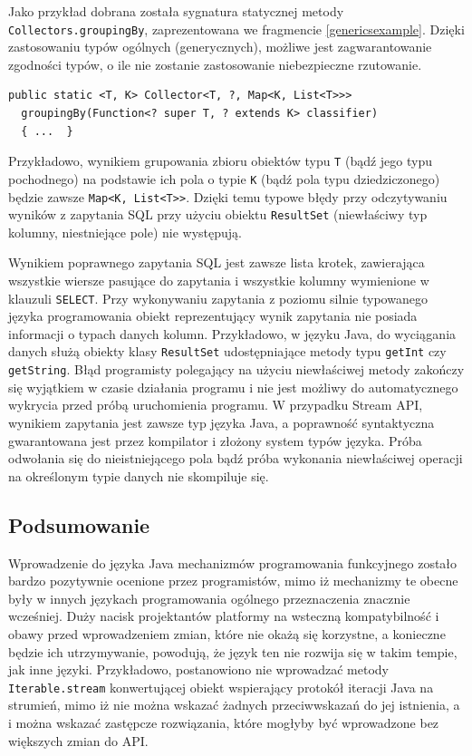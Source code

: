 \documentclass[12pt,twoside,openright]{extarticle}
\begin{document}
    Jako przykład dobrana została sygnatura statycznej metody \newline \texttt{Collectors.groupingBy}, zaprezentowana we fragmencie \ref{genericsexample}. Dzięki zastosowaniu typów ogólnych \cite{generics} (generycznych), możliwe jest zagwarantowanie zgodności typów, o ile nie zostanie zastosowanie niebezpieczne rzutowanie.

\begin{lstlisting}[label=genericsexample, caption=Sygnatura metody grupującej]
  public static <T, K> Collector<T, ?, Map<K, List<T>>>
  groupingBy(Function<? super T, ? extends K> classifier) 
  { ...  }
\end{lstlisting}

    Przykładowo, wynikiem grupowania zbioru obiektów typu \texttt{T} (bądź jego typu pochodnego) na podstawie ich pola o typie \texttt{K} (bądź pola typu dziedziczonego) będzie zawsze \texttt{Map<K, List<T>}\texttt{>}. Dzięki temu typowe błędy przy odczytywaniu wyników z zapytania SQL przy użyciu obiektu \texttt{ResultSet} (niewłaściwy typ kolumny, niestniejące pole) nie występują.

    Wynikiem poprawnego zapytania SQL jest zawsze lista krotek, zawierająca wszystkie wiersze pasujące do zapytania i wszystkie kolumny wymienione w klauzuli \texttt{SELECT}. Przy wykonywaniu zapytania z poziomu silnie typowanego języka programowania obiekt reprezentujący wynik zapytania nie posiada informacji o typach danych kolumn. Przykładowo, w języku Java, do wyciągania danych służą obiekty klasy \texttt{ResultSet} udostępniające metody typu \texttt{getInt} czy \texttt{getString}. Błąd programisty polegający na użyciu niewłaściwej metody zakończy się wyjątkiem w czasie działania programu i nie jest możliwy do automatycznego wykrycia przed próbą uruchomienia programu. W przypadku Stream API, wynikiem zapytania jest zawsze typ języka Java, a poprawność syntaktyczna gwarantowana jest przez kompilator i złożony system typów języka. Próba odwołania się do nieistniejącego pola bądź próba wykonania niewłaściwej operacji na określonym typie danych nie skompiluje się. 

\subsection{Podsumowanie}

    Wprowadzenie do języka Java mechanizmów programowania funkcyjnego zostało bardzo pozytywnie ocenione przez programistów, mimo iż mechanizmy te obecne były w innych językach programowania ogólnego przeznaczenia znacznie wcześniej. Duży nacisk projektantów platformy na wsteczną kompatybilność i obawy przed wprowadzeniem zmian, które nie okażą się korzystne, a konieczne będzie ich utrzymywanie, powodują, że język ten nie rozwija się w takim tempie, jak inne języki. Przykładowo, postanowiono nie wprowadzać metody \texttt{Iterable.stream} konwertującej obiekt wspierający protokół iteracji Java na strumień, mimo iż nie można wskazać żadnych przeciwwskazań do jej istnienia, a i można wskazać zastępcze rozwiązania, które mogłyby być wprowadzone bez większych zmian do API.
\end{document}
